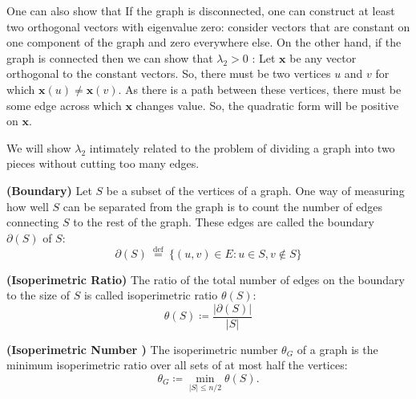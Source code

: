 \documentclass{article}
\newcommand{\bfs}[1]{\textbf{({#1}) }}
\begin{document}
One can also show that  If the graph is disconnected, one can construct at least two orthogonal vectors with eigenvalue zero: consider vectors that are constant on one component of the graph and zero everywhere else. On the other hand, if the graph is connected then we can show that $\lambda_{2}>0$ : Let $\boldsymbol{x}$ be any vector orthogonal to the constant vectors. So, there must be two vertices $u$ and $v$ for which $\boldsymbol{x}(u) \neq \boldsymbol{x}(v) .$ As there is a path between these vertices, there must be some edge across which $\boldsymbol{x}$ changes value. So, the quadratic form will be positive on $\boldsymbol{x}$.

We will show $\lambda_{2}$ intimately related to the problem of dividing a graph into two pieces without cutting too many edges.

\begin{defa}{\bfs{Boundary}}
Let $S$ be a subset of the vertices of a graph. One way of measuring how well $S$ can be separated from the graph is to count the number of edges connecting $S$ to the rest of the graph. These edges are called the boundary $\partial(S)$ of $S$:
$$
\partial(S) \stackrel{\text { def }}{=}\{(u, v) \in E: u \in S, v \notin S\}
$$
\end{defa}
\begin{defa}{\bfs{Isoperimetric Ratio}} The ratio of the total number of edges on the boundary to the size of $S$ is called isoperimetric ratio $\theta(S)$:
$$
\theta(S)\coloneqq \frac{|\partial(S)|}{|S|}
$$
\end{defa}
\begin{defa}{\bfs{Isoperimetric Number }}
The isoperimetric number $\theta_{G}$ of a graph is the minimum isoperimetric ratio over all sets of at most half the vertices:
$$
\theta_{G} \coloneqq \min _{|S| \leq n / 2} \theta(S) .
$$
\end{defa}
\end{document}
